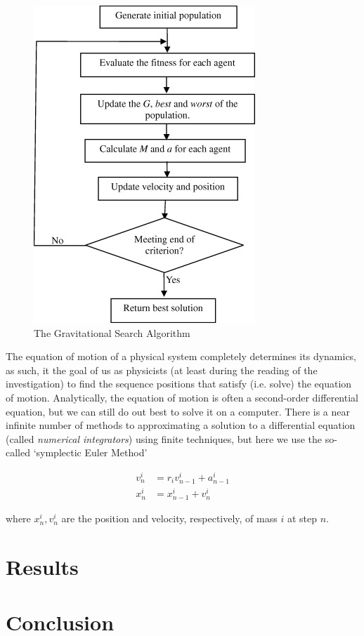 \documentclass{article}
\begin{document}
            \begin{figure}
                \begin{center}
                    \includegraphics{Images/GSA.jpg}
                \end{center}
                \caption{The Gravitational Search Algorithm}
            \end{figure}

            The equation of motion of a physical system completely determines its dynamics, as such, it the goal of us as physicists (at least during the reading of the investigation) to find the sequence positions that satisfy (i.e. solve) the equation of motion.  Analytically, the equation of motion is often a second-order differential equation, but we can still do out best to solve it on a computer.  There is a near infinite number of methods to approximating a solution to a differential equation (called \emph{numerical integrators}) using finite techniques, but here we use the so-called `symplectic Euler Method'

            \begin{align}
                v_n^i &= r_i v_{n-1}^i + a_{n - 1}^i \\
                x_n^i &= x_{n - 1}^i + v_n^i
            \end{align}

            where $x_n^i, v_n^i$ are the position and velocity, respectively, of mass $i$ at step $n$.

\clearpage
\newpage

\section{Results}
\section{Conclusion}

\pagebreak
\nocite*{}

\end{document}
